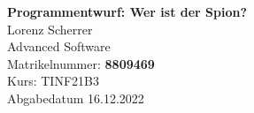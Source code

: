 \documentclass[
  ngerman
  ,12pt
  ,pdftex
]{report}
\begin{document}
\begin{titlepage}
  \begin{center}
      {\Huge \textbf{Programmentwurf: Wer ist der Spion?}}\\[1.5cm]
      {\Large Lorenz Scherrer}\\[1cm]
      {\Huge Advanced Software}\\[7cm]
      {\large Matrikelnummer: \textbf{8809469}}\\[0.5cm]
      {\large Kurs: TINF21B3}\\[0.5cm]
      {\large Abgabedatum 16.12.2022}
      \vfill
  \end{center}
\end{titlepage}
\newpage
\tableofcontents
\newpage


\newpage

\newpage

\newpage

\newpage




\end{document}
